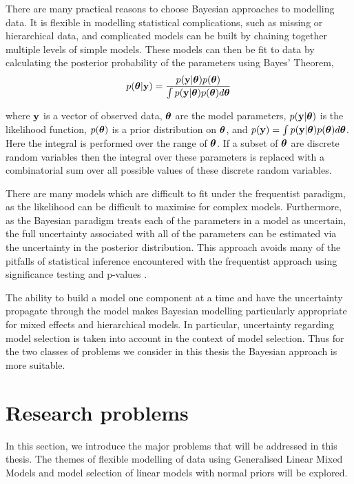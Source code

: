 There are many practical reasons to choose Bayesian approaches to modelling
data. It is flexible in modelling statistical complications, such as missing or
hierarchical data, and complicated models can be built by chaining together
multiple levels of simple models. These models can then be fit to data by
calculating the posterior probability of the parameters using Bayes' Theorem,
\begin{equation}\label{eq:bayes_theorem}
	p({\boldsymbol \theta} | {\bf y}) = \frac{p({\bf y} | {\boldsymbol \theta}) p({\boldsymbol \theta})}{\int p({\bf y} | {\boldsymbol \theta}) p({\boldsymbol \theta}) d {\boldsymbol \theta}}
\end{equation}

\noindent where ${\bf y}$ is a vector of observed data, ${\boldsymbol \theta}$ are the model
parameters, $p({\bf y}|{\boldsymbol \theta})$ is the likelihood function, $p({\boldsymbol \theta})$ is a
prior distribution on ${\boldsymbol \theta}$, and $p({\bf y})=\int
p({\bf y}|{\boldsymbol \theta})p({\boldsymbol \theta})d{\boldsymbol \theta}$.  Here the integral is performed over the
range of ${\boldsymbol \theta}$. If a subset of ${\boldsymbol \theta}$ are discrete random variables
then the integral over these parameters is replaced with a combinatorial sum
over all possible values of these discrete random variables.

There are many models which are difficult to fit under the frequentist paradigm,
as the likelihood can be difficult to maximise for complex models. Furthermore,
as the Bayesian paradigm treats each of the parameters in a model as uncertain,
the full uncertainty associated with all of the parameters can be estimated via
the uncertainty in the posterior distribution. This approach avoids many of the
pitfalls of statistical inference encountered with the frequentist approach
using significance testing and p-values \citep{Cox2005}.

The ability to build a model one component at a time and have the uncertainty
propagate through the model makes Bayesian modelling  particularly appropriate
for mixed effects and hierarchical models. In particular, uncertainty regarding
model selection is taken into account in the context of model selection. Thus
for the two classes of problems we consider in this thesis the Bayesian approach
is more suitable.

\section{Research problems}

In this section, we introduce the major problems that will be addressed in this
thesis. The themes of flexible modelling of data using Generalised Linear Mixed
Models and model selection of linear models with normal priors  will be
explored.

